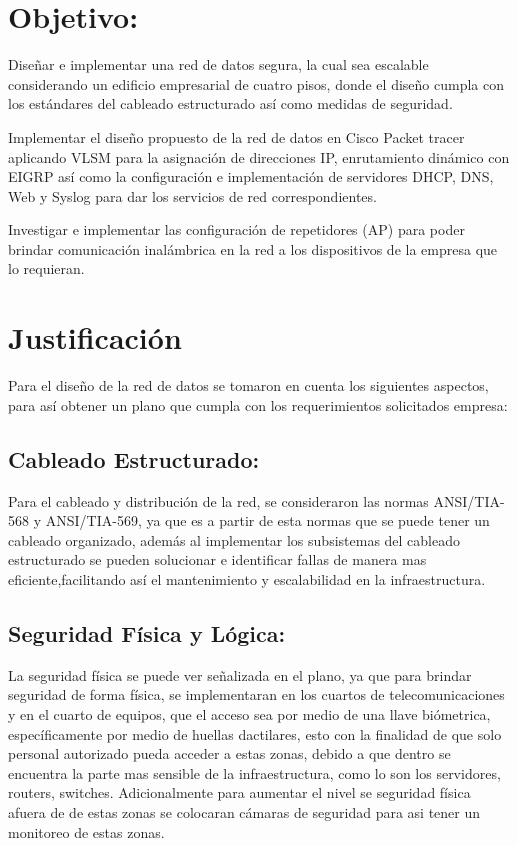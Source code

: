 \documentclass[letterpaper,11pt]{article}
\begin{document}
    \section{Objetivo:}

    Diseñar e implementar una red de datos segura, la cual sea escalable considerando un edificio empresarial de cuatro pisos, donde el diseño cumpla con los estándares del cableado estructurado así como medidas de seguridad.

    Implementar el diseño propuesto de la red de datos en Cisco Packet tracer aplicando VLSM para la asignación de direcciones IP, enrutamiento dinámico con EIGRP así como la configuración e implementación de servidores DHCP, DNS, Web y Syslog para dar los servicios de red correspondientes.

    Investigar e implementar las configuración de repetidores (AP) para poder brindar comunicación inalámbrica en la red a los dispositivos de la empresa que lo requieran.

    \section{Justificación}

    Para el diseño de la red de datos se tomaron en cuenta los siguientes aspectos, para así obtener un plano que cumpla con los requerimientos solicitados  empresa:

    \subsection{Cableado Estructurado:}

    Para el cableado y distribución de la red, se consideraron las normas ANSI/TIA-568 y ANSI/TIA-569, ya que es a partir de esta normas que se puede tener un cableado organizado, además al implementar los subsistemas del cableado estructurado se pueden solucionar e identificar fallas de manera mas eficiente,facilitando así el mantenimiento y escalabilidad en la infraestructura.

    \subsection{Seguridad Física y Lógica:}

    La seguridad física se puede ver señalizada en el plano, ya que para brindar seguridad de forma física, se implementaran en los cuartos de telecomunicaciones y en el cuarto de equipos, que el acceso sea por medio de una llave biómetrica, específicamente por medio de huellas dactilares, esto con la finalidad de que solo personal autorizado pueda acceder a estas zonas, debido a que dentro se encuentra la parte mas sensible de la infraestructura, como lo son los servidores, routers, switches. Adicionalmente para aumentar el nivel se seguridad física afuera de de estas zonas se colocaran cámaras de seguridad para asi tener un monitoreo de estas zonas.
\end{document}
